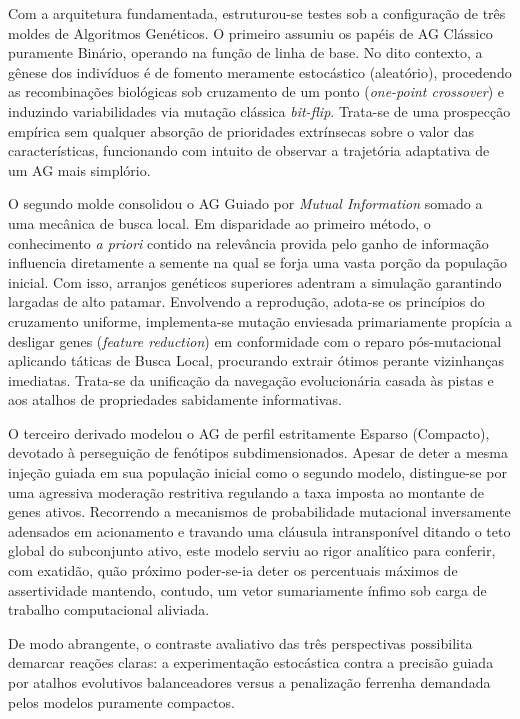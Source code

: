 \documentclass[12pt]{article}
\begin{document}
Com a arquitetura fundamentada, estruturou-se testes sob a configuração de três moldes de Algoritmos Genéticos. O primeiro assumiu os papéis de AG Clássico puramente Binário, operando na função de linha de base. No dito contexto, a gênese dos indivíduos é de fomento meramente estocástico (aleatório), procedendo as recombinações biológicas sob cruzamento de um ponto (\textit{one-point crossover}) e induzindo variabilidades via mutação clássica \textit{bit-flip}. Trata-se de uma prospecção empírica sem qualquer absorção de prioridades extrínsecas sobre o valor das características, funcionando com intuito de observar a trajetória adaptativa de um AG mais simplório.

O segundo molde consolidou o AG Guiado por \textit{Mutual Information} somado a uma mecânica de busca local. Em disparidade ao primeiro método, o conhecimento \textit{a priori} contido na relevância provida pelo ganho de informação influencia diretamente a semente na qual se forja uma vasta porção da população inicial. Com isso, arranjos genéticos superiores adentram a simulação garantindo largadas de alto patamar. Envolvendo a reprodução, adota-se os princípios do cruzamento uniforme, implementa-se mutação enviesada primariamente propícia a desligar genes (\textit{feature reduction}) em conformidade com o reparo pós-mutacional aplicando táticas de Busca Local, procurando extrair ótimos perante vizinhanças imediatas. Trata-se da unificação da navegação evolucionária casada às pistas e aos atalhos de propriedades sabidamente informativas.

O terceiro derivado modelou o AG de perfil estritamente Esparso (Compacto), devotado à perseguição de fenótipos subdimensionados. Apesar de deter a mesma injeção guiada em sua população inicial como o segundo modelo, distingue-se por uma agressiva moderação restritiva regulando a taxa imposta ao montante de genes ativos. Recorrendo a mecanismos de probabilidade mutacional inversamente adensados em acionamento e travando uma cláusula intransponível ditando o teto global do subconjunto ativo, este modelo serviu ao rigor analítico para conferir, com exatidão, quão próximo poder-se-ia deter os percentuais máximos de assertividade mantendo, contudo, um vetor sumariamente ínfimo sob carga de trabalho computacional aliviada.

De modo abrangente, o contraste avaliativo das três perspectivas possibilita demarcar reações claras: a experimentação estocástica contra a precisão guiada por atalhos evolutivos balanceadores versus a penalização ferrenha demandada pelos modelos puramente compactos.
\end{document}
